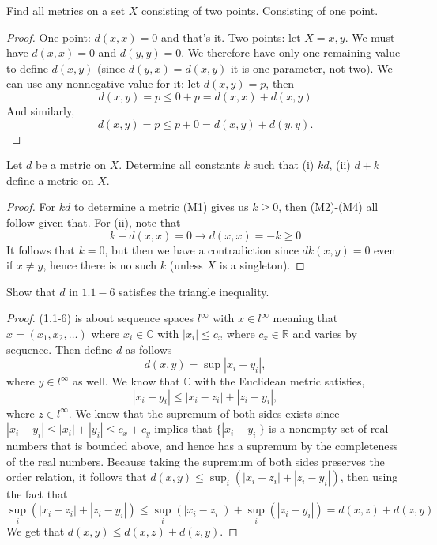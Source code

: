 \documentclass[12pt]{article}
\newcommand{\R}{\mathbb{R}}
\newcommand{\C}{\mathbb{C}}
\newenvironment{exercise}[2][Exercise]{\begin{trivlist}
\item[\hskip \labelsep {\bfseries #1}\hskip \labelsep {\bfseries #2.}]}{\end{trivlist}}
\begin{document}
\begin{exercise}{1.1.4}
    Find all metrics on a set $X$ consisting of two points. Consisting of one point.
\end{exercise}
\begin{proof}
    One point: $d(x, x) = 0$ and that's it. Two points: let $X = { x, y }$. We must have $d(x, x) = 0$ and $d(y, y) = 0$. We therefore have only one remaining value to define $d(x, y)$ (since $d(y, x) = d(x, y)$ it is one parameter, not two). We can use any nonnegative value for it: let $d(x, y) = p$, then
    \[ d(x, y) = p \leq 0 + p = d(x, x) + d(x, y) \]
    And similarly,
    \[ d(x, y) = p \leq p + 0 = d(x, y) + d(y, y). \]
\end{proof}

\begin{exercise}{1.1.5}
    Let $d$ be a metric on $X$. Determine all constants $k$ such that (i) $kd$, (ii) $d + k$ define a metric on $X$.
\end{exercise}
\begin{proof}
    For $kd$ to determine a metric (M1) gives us $k \geq 0$, then (M2)-(M4) all follow given that. For (ii), note that
    \[ k + d(x, x) = 0 \rightarrow d(x, x) = -k \geq 0 \]
    It follows that $k = 0$, but then we have a contradiction since $dk (x, y) = 0$ even if $x \neq y$, hence there is no such $k$ (unless $X$ is a singleton).
\end{proof}

\begin{exercise}{1.1.6}
    Show that $d$ in $1.1-6$ satisfies the triangle inequality.
\end{exercise}
\begin{proof}
    (1.1-6) is about sequence spaces $l^{\infty}$ with $x \in l^{\infty}$ meaning that $x = (x_1, x_2, \ldots)$ where $x_i \in \C$ with $|x_i| \leq c_x$ where $c_x \in \R$ and varies by sequence. Then define $d$ as follows \[ d(x, y) = \sup |x_i - y_i|, \]
    where $y \in l^{\infty}$ as well. We know that $\C$ with the Euclidean metric satisfies,
    \[ |x_i - y_i| \leq |x_i - z_i| + |z_i - y_i|, \]
    where $z \in l^{\infty}$. We know that the supremum of both sides exists since $|x_i - y_i| \leq |x_i| + |y_i| \leq c_x + c_y$ implies that $\{ |x_i - y_i| \}$ is a nonempty set of real numbers that is bounded above, and hence has a supremum by the completeness of the real numbers. Because taking the supremum of both sides preserves the order relation, it follows that $d(x, y) \leq \sup_{i} (|x_i - z_i| + |z_i - y_i|)$, then using the fact that 
    \[ \sup_{i} (|x_i - z_i| + |z_i - y_i|) \leq \sup_i (|x_i - z_i|) + \sup_i (|z_i - y_i|) = d(x, z) + d(z, y) \]
    We get that $d(x, y) \leq d(x, z) + d(z, y)$.
\end{proof}
\end{document}
